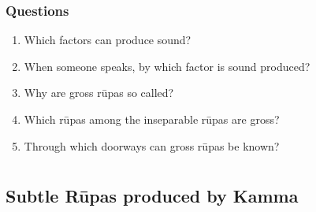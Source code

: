 \documentclass{book}
\begin{document}
\subsection*{Questions} 




\begin{enumerate}
\item Which factors can produce sound?

\item When someone speaks, by which factor is sound produced?

\item Why are gross r\=upas so called?

\item Which r\=upas among the inseparable r\=upas are gross?

\item Through which doorways can gross r\=upas be known?

\end{enumerate}



















































\chapter[Subtle R\=upas and Kamma]{}
\section*{Subtle R\=upas produced by Kamma}
\end{document}
